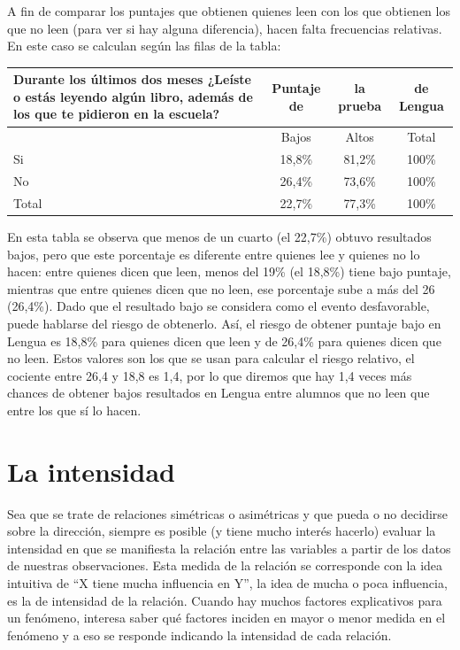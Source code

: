\documentclass[]{book}
\begin{document}
A fin de comparar los puntajes que obtienen quienes leen con los que
obtienen los que no leen (para ver si hay alguna diferencia), hacen
falta frecuencias relativas. En este caso se calculan según las filas de la tabla:

\begin{longtable}[]{@{}lccc@{}}
\toprule
Durante los últimos dos meses ¿Leíste o estás leyendo algún libro, además de los que te pidieron en la escuela? & Puntaje de & la prueba & de Lengua\tabularnewline
\midrule
\endhead
& Bajos & Altos & Total\tabularnewline
Si & 18,8\% & 81,2\% & 100\%\tabularnewline
No & 26,4\% & 73,6\% & 100\%\tabularnewline
Total & 22,7\% & 77,3\% & 100\%\tabularnewline
\bottomrule
\end{longtable}

En esta tabla se observa que menos de un cuarto (el 22,7\%) obtuvo
resultados bajos, pero que este porcentaje es diferente entre quienes
lee y quienes no lo hacen: entre quienes dicen que leen, menos del 19\%
(el 18,8\%) tiene bajo puntaje, mientras que entre quienes dicen que no
leen, ese porcentaje sube a más del 26 (26,4\%). Dado que el resultado
bajo se considera como el evento desfavorable, puede hablarse del riesgo
de obtenerlo. Así, el riesgo de obtener puntaje bajo en Lengua es 18,8\%
para quienes dicen que leen y de 26,4\% para quienes dicen que no leen.
Estos valores son los que se usan para calcular el riesgo relativo, el
cociente entre 26,4 y 18,8 es 1,4, por lo que diremos que hay 1,4 veces
más chances de obtener bajos resultados en Lengua entre alumnos que no
leen que entre los que sí lo hacen.

\hypertarget{la-intensidad}{%
\section{La intensidad}\label{la-intensidad}}

Sea que se trate de relaciones simétricas o asimétricas y que pueda o no
decidirse sobre la dirección, siempre es posible (y tiene mucho interés
hacerlo) evaluar la intensidad en que se manifiesta la relación
entre las variables a partir de los datos de nuestras observaciones.
Esta medida de la relación se corresponde con la idea intuitiva de ``X
tiene mucha influencia en Y'', la idea de mucha o poca influencia, es la
de intensidad de la relación. Cuando hay muchos factores explicativos
para un fenómeno, interesa saber qué factores inciden en mayor o menor
medida en el fenómeno y a eso se responde indicando la intensidad de
cada relación.
\end{document}
